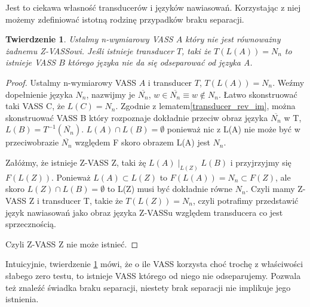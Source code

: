 \documentclass[magisterska]{pracamgr}
\newtheorem{theorem}{Twierdzenie}[section]
\newtheorem{lemma}[theorem]{Lemat}
\newtheorem{proof}[theorem]{Dowód}
\begin{document}
    Jest to ciekawa własność transducerów i języków nawiasowań.
    Korzystając z niej możemy zdefiniować istotną rodzinę przypadków braku separacji.

    \begin{theorem}
        \label{bracket-language}
        Ustalmy n-wymiarowy VASS $A$ który nie jest równoważny żadnemu Z-VASSowi.
        Jeśli istnieje transducer $T$, taki że $T(L(A)) = N_n$ to istnieje VASS $B$ którego języka nie da się odseparować od języka A.
    \end{theorem}
    \begin{proof}
        Ustalmy n-wymiarowy VASS $A$ i transducer $T$, $T(L(A)) = N_n$.
        Weźmy dopełnienie języka $N_n$, nazwijmy je $\overline{N_n}$, $w \in \overline{N_n} \equiv w \notin N_n$.
        Łatwo skonstruować taki VASS C, że $L(C) = N_n$.
        Zgodnie z lematem\ref{transducer_rev_im}, można skonstruować VASS B który rozpoznaje dokładnie przeciw obraz języka
        $\overline{N_n}$ w T, $L(B) = T^{-1}(\overline{N_n})$.
        $L(A) \cap L(B) = \emptyset$ ponieważ nic z L(A) nie może być w przeciwobrazie $\overline{N_n}$ względem F skoro obrazem L(A) jest $N_n$.

        Załóżmy, że istnieje Z-VASS Z, taki żę $L(A) \mid_{L(Z)} L(B)$ i przyjrzyjmy się $F(L(Z))$.
        Ponieważ $L(A) \subset L(Z)$ to $F(L(A)) = N_n \subset F(Z)$, ale skoro $L(Z) \cap L(B) = \emptyset$ to L(Z) musi być dokładnie równe $N_n$.
        Czyli mamy Z-VASS Z i transducer T, takie że $T(L(Z)) = N_n$, czyli potrafimy przedstawić język nawiasowań jako obraz
        języka Z-VASSu względem transducera co jest sprzecznością.

        Czyli Z-VASS Z nie może istnieć.

    \end{proof}

    Intuicyjnie, twierdzenie \ref{bracket-language} mówi, że o ile VASS korzysta choć trochę z właściwości słabego zero testu,
    to istnieje VASS którego od niego nie odseparujemy.
    Pozwala też znaleźć świadka braku separacji, niestety brak separacji nie implikuje jego istnienia.
\end{document}

